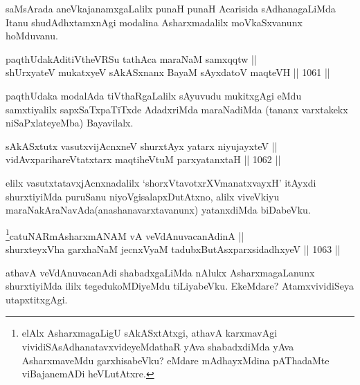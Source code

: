\begin{artha}
saMsArada aneVkajanamxgaLalilx punaH punaH Acarisida sAdhanagaLiMda Itanu shudAdhxtamxnAgi modalina Asharxmadalilx moVkaSxvanunx hoMduvanu.
\end{artha}


\begin{shl}
paqthUdakAditiVtheVRSu tathAca maraNaM samxqqtw || \\
shUrxyateV mukatxyeV sAkASxnanx BayaM sAyxdatoV maqteVH \hfill || 1061 ||  
\end{shl}

\begin{artha}
paqthUdaka modalAda tiVthaRgaLalilx sAyuvudu mukitxgAgi eMdu samxtiyalilx sapxSaTxpaTiTxde AdadxriMda maraNadiMda (tananx varxtakekx niSaPxlateyeMba) Bayavilalx.
\end{artha}

\begin{shl}
sAkASxtutx vasutxvijAcnxneV shurxtAyx yatarx niyujayxteV || \\
vidAvxparihareVtatxtarx maqtiheVtuM parxyatanxtaH \hfill || 1062 ||  
\end{shl}

\begin{artha}
elilx vasutxtatavxjAcnxnadalilx `shorxVtavotxrXVmanatxvayxH' itAyxdi shurxtiyiMda puruSanu niyoVgisalapxDutAtxno, alilx viveVkiyu maraNakAraNavAda(anashanavarxtavanunx) yatanxdiMda biDabeVku.
\end{artha}


\begin{shl}
\footnote{elAlx AsharxmagaLigU sAkASxtAtxgi, athavA karxmavAgi vividiSAsAdhanatavxvideyeMdathaR yAva shabadxdiMda yAva AsharxmaveMdu garxhisabeVku? eMdare mAdhayxMdina pAThadaMte viBajanemADi heVLutAtxre.}catuNARmAsharxmANAM vA veVdAnuvacanAdinA || \\
shurxteyxVha garxhaNaM jecnxVyaM tadubxButAsxparxsidadhxyeV \hfill || 1063 ||  
\end{shl}

\begin{artha}
athavA veVdAnuvacanAdi shabadxgaLiMda nAlukx AsharxmagaLanunx shurxtiyiMda ililx tegedukoMDiyeMdu tiLiyabeVku. EkeMdare? AtamxvividiSeya utapxtitxgAgi.
\end{artha}

